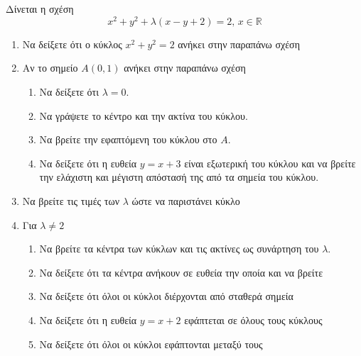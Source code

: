 \documentclass[12pt]{article}
\begin{document}
\part*{}

Δίνεται η σχέση
$$x^2+y^2+λ(x-y+2)=2 \text{, } x\in \mathbb{R}$$
\begin{enumerate}
 \item Να δείξετε ότι ο κύκλος $x^2+y^2=2$ ανήκει στην παραπάνω σχέση
 \item Αν το σημείο $A(0,1)$ ανήκει στην παραπάνω σχέση
   \begin{enumerate}
    \item Να δείξετε ότι $λ=0$.
    \item Να γράψετε το κέντρο και την ακτίνα του κύκλου.
    \item Να βρείτε την εφαπτόμενη του κύκλου στο $A$.
    \item Να δείξετε ότι η ευθεία $y=x+3$ είναι εξωτερική του κύκλου και να βρείτε την ελάχιστη και μέγιστη απόστασή της από τα σημεία του κύκλου.
   \end{enumerate}
 \item Να βρείτε τις τιμές των $λ$ ώστε να παριστάνει κύκλο
 \item Για $λ\ne 2$
   \begin{enumerate}
      \item Να βρείτε τα κέντρα των κύκλων και τις ακτίνες ως συνάρτηση του $λ$.
      \item Να δείξετε ότι τα κέντρα ανήκουν σε ευθεία την οποία και να βρείτε
      \item Να δείξετε ότι όλοι οι κύκλοι διέρχονται από σταθερά σημεία
      \item Να δείξετε ότι η ευθεία $y=x+2$ εφάπτεται σε όλους τους κύκλους
      \item Να δείξετε ότι όλοι οι κύκλοι εφάπτονται μεταξύ τους
   \end{enumerate}
\end{enumerate}

\pagebreak

\part*{}
\end{document}
